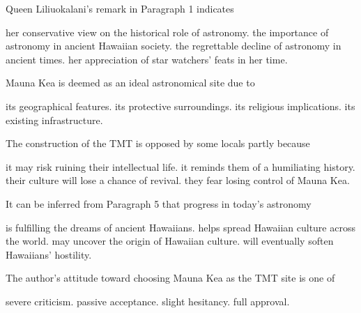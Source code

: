 \item Queen Liliuokalani's remark in Paragraph 1 indicates
\begin{tasks}
	\task her conservative view on the historical role of astronomy.
	\task the importance of astronomy in ancient Hawaiian society.
	\task the regrettable decline of astronomy in ancient times.
	\task her appreciation of star watchers' feats in her time.
\end{tasks}
\item Mauna Kea is deemed as an ideal astronomical site due to
\begin{tasks}
	\task its geographical features.
	\task its protective surroundings.
	\task its religious implications.
	\task its existing infrastructure.
\end{tasks}
\item The construction of the TMT is opposed by some locals partly because
\begin{tasks}
	\task it may risk ruining their intellectual life.
	\task it reminds them of a humiliating history.
	\task their culture will lose a chance of revival.
	\task they fear losing control of Mauna Kea.
\end{tasks}
\item It can be inferred from Paragraph 5 that progress in today's astronomy
\begin{tasks}
	\task is fulfilling the dreams of ancient Hawaiians.
	\task helps spread Hawaiian culture across the world.
	\task may uncover the origin of Hawaiian culture.
	\task will eventually soften Hawaiians' hostility.
\end{tasks}
\item The author's attitude toward choosing Mauna Kea as the TMT site is one of
\begin{tasks}
	\task severe criticism.
	\task passive acceptance.
	\task slight hesitancy.
	\task full approval.
\end{tasks}